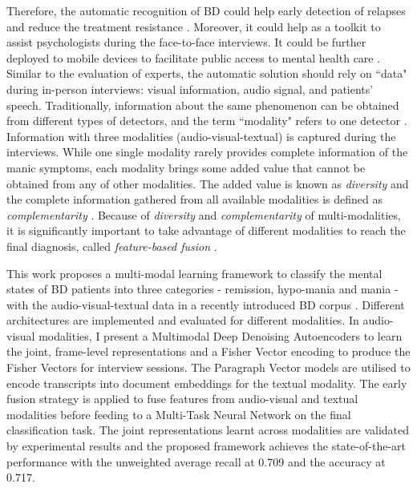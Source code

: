 Therefore, the automatic recognition of BD could help early detection of relapses and reduce the treatment resistance \cite{bauer2017, cciftcci2018}. Moreover, it could help as a toolkit to assist psychologists during the face-to-face interviews. It could be further deployed to mobile devices to facilitate public access to mental health care \cite{haque2018}. Similar to the evaluation of experts, the automatic solution should rely on ``data" during in-person interviews: visual information, audio signal, and patients' speech. Traditionally, information about the same phenomenon can be obtained from different types of detectors, and the term ``modality" refers to one detector \cite{lahat2015}. Information with three modalities (audio-visual-textual) is captured during the interviews. While one single modality rarely provides complete information of the manic symptoms, each modality brings some added value that cannot be obtained from any of other modalities. The added value is known as \textit{diversity} and the complete information gathered from all available modalities is defined as \textit{complementarity} \cite{lahat2015, mcgurk1976}. Because of \textit{diversity} and \textit{complementarity} of multi-modalities, it is significantly important to take advantage of different modalities to reach the final diagnosis, called \textit{feature-based fusion} \cite{calhoun2008}. 

This work proposes a multi-modal learning framework to classify the mental states of BD patients into three categories - remission, hypo-mania and mania - with the audio-visual-textual data in a recently introduced BD corpus \cite{cciftcci2018}. Different architectures are implemented and evaluated for different modalities. In audio-visual modalities, I present a Multimodal Deep Denoising Autoencoders to learn the joint, frame-level representations and a Fisher Vector encoding to produce the Fisher Vectors for interview sessions. The Paragraph Vector models are utilised to encode transcripts into document embeddings for the textual modality. The early fusion strategy is applied to fuse features from audio-visual and textual modalities before feeding to a Multi-Task Neural Network on the final classification task. The joint representations learnt across modalities are validated by experimental results and the proposed framework achieves the state-of-the-art performance with the unweighted average recall at 0.709 and the accuracy at 0.717.

